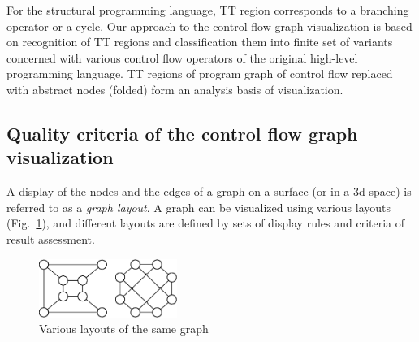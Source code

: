 \documentclass[conference]{IEEEtran}
\begin{document}
For the structural programming language, TT region corresponds to a branching operator or a cycle.  Our approach to the control flow graph visualization is based on recognition of TT regions and classification them into finite set of variants concerned with various control flow operators of the original high-level programming language.  TT regions of program graph of control flow replaced with abstract nodes (folded) form an analysis basis of visualization.

\subsection{Quality criteria of the control flow graph visualization}
\label{sec:qcrit}

A display of the nodes and the edges of a graph on a surface (or in a 3d-space) is referred to as a \emph{graph layout}.  A graph can be visualized using various layouts (Fig.~\ref{fig:VisExample}), and different layouts are defined by sets of display rules and criteria of result assessment.

\begin{figure}[b]
	\centering
		\includegraphics[width=0.4\textwidth]{Pic/Pic1.eps}
	\caption{Various layouts of the same graph}
	\label{fig:VisExample}
\end{figure}
\end{document}
